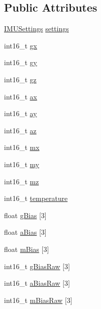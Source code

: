 \subsection*{Public Attributes}
\begin{DoxyCompactItemize}
\item 
\hyperlink{_l_s_m9_d_s1___types_8h_struct_i_m_u_settings}{I\+M\+U\+Settings} \hyperlink{class_l_s_m9_d_s1_a8397fc6c94a11a8a09f3dd17b28cf2a4}{settings}
\item 
int16\+\_\+t \hyperlink{class_l_s_m9_d_s1_abf02b4544b5d529036adbac02e7b9f02}{gx}
\item 
int16\+\_\+t \hyperlink{class_l_s_m9_d_s1_a0c351823fd094ff24ff245dd951cf783}{gy}
\item 
int16\+\_\+t \hyperlink{class_l_s_m9_d_s1_ad4d0f0585398ff917afcba1b4a73e519}{gz}
\item 
int16\+\_\+t \hyperlink{class_l_s_m9_d_s1_adac13514d176cfb54aed8cda9a056335}{ax}
\item 
int16\+\_\+t \hyperlink{class_l_s_m9_d_s1_a978a357dedfa574d6e0fad33ad71e23f}{ay}
\item 
int16\+\_\+t \hyperlink{class_l_s_m9_d_s1_aa631c8a90b90130b5be147dd4fae0841}{az}
\item 
int16\+\_\+t \hyperlink{class_l_s_m9_d_s1_a0e68eb9e44969070b6d84a93ba252f71}{mx}
\item 
int16\+\_\+t \hyperlink{class_l_s_m9_d_s1_a773f80f9b7cdf8375c84a4209895d732}{my}
\item 
int16\+\_\+t \hyperlink{class_l_s_m9_d_s1_aafe23993500ece9efd161e564787dce2}{mz}
\item 
int16\+\_\+t \hyperlink{class_l_s_m9_d_s1_a92791effe47c0f8c93505e53496266e5}{temperature}
\item 
float \hyperlink{class_l_s_m9_d_s1_a8c0354ee78e029b6715ee7110bcd8753}{g\+Bias} \mbox{[}3\mbox{]}
\item 
float \hyperlink{class_l_s_m9_d_s1_abe998fcc50cfe729c13ab535337849c7}{a\+Bias} \mbox{[}3\mbox{]}
\item 
float \hyperlink{class_l_s_m9_d_s1_aab3753b958a1eaabfb48ffaf837dfadc}{m\+Bias} \mbox{[}3\mbox{]}
\item 
int16\+\_\+t \hyperlink{class_l_s_m9_d_s1_ab2e59e0460cf88a12765238506031f2a}{g\+Bias\+Raw} \mbox{[}3\mbox{]}
\item 
int16\+\_\+t \hyperlink{class_l_s_m9_d_s1_ae42dc2f2b9f2df223c853e233191313a}{a\+Bias\+Raw} \mbox{[}3\mbox{]}
\item 
int16\+\_\+t \hyperlink{class_l_s_m9_d_s1_ad0e3ab0b7eeee5378ab91dd20270a9b5}{m\+Bias\+Raw} \mbox{[}3\mbox{]}
\end{DoxyCompactItemize}
